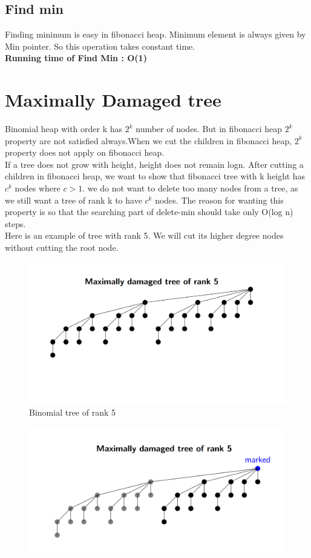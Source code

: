 \documentclass[14pt,a4paper]{report}
\begin{document}
\subsection{Find min}
Finding minimum is easy in fibonacci heap. Minimum element is always given by Min pointer. So this operation takes constant time.\\[0.5cm]
\textbf{Running time of Find Min : O(1)}
\section{Maximally Damaged tree}
Binomial heap with order k has $2^{k}$ number of nodes. But in fibonacci heap $2^{k}$ property are not satisfied always.When we cut the children in fibonacci heap, $2^{k}$ property does not apply on fibonacci heap.\\
If a tree does not grow with height, height does not remain logn. After cutting a children in fibonacci heap, we want to show that fibonacci tree with k height has $c^{k}$ nodes where $c>1$. we do not want to delete too many nodes from a tree, as we still want a tree of rank k to have $c^{k}$ nodes. The reason for wanting this property is so that the searching part of delete-min should take only O(log n) steps. 
\\
Here is an example of tree with rank 5. We will cut its higher degree nodes without cutting the root node.
\begin{figure}[h]
    \includegraphics[scale=.3,bb=0 0 404 401]{1.png}
    \caption{Binomial tree of rank 5}
    \label{fig:one}
\end{figure}
\begin{figure}[H]
    \includegraphics[scale=.3,bb=0 0 404 401]{2.png}
    \caption{}
    \label{fig:two}
\end{figure}
\end{document}
